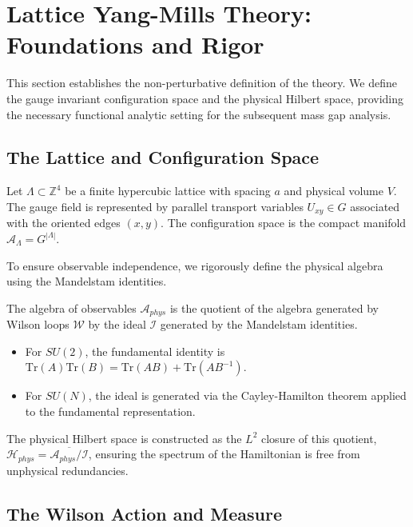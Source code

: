 \section{Lattice Yang-Mills Theory: Foundations and Rigor}
\label{sec:lattice_foundations}

This section establishes the non-perturbative definition of the theory. We define the gauge invariant configuration space and the physical Hilbert space, providing the necessary functional analytic setting for the subsequent mass gap analysis.

\subsection{The Lattice and Configuration Space}

Let \(\Lambda \subset \mathbb{Z}^4\) be a finite hypercubic lattice with spacing \(a\) and physical volume \(V\). The gauge field is represented by parallel transport variables \(U_{xy} \in G\) associated with the oriented edges \((x,y)\). The configuration space is the compact manifold \(\mathcal{A}_\Lambda = G^{|\Lambda|}\).

To ensure observable independence, we rigorously define the physical algebra using the Mandelstam identities.

\begin{definition}
The algebra of observables \(\mathcal{A}_{phys}\) is the quotient of the algebra generated by Wilson loops \(\mathcal{W}\) by the ideal \(\mathcal{I}\) generated by the Mandelstam identities.
\begin{itemize}
    \item For \(SU(2)\), the fundamental identity is \(\text{Tr}(A)\text{Tr}(B) = \text{Tr}(AB) + \text{Tr}(AB^{-1})\).
    \item For \(SU(N)\), the ideal is generated via the Cayley-Hamilton theorem applied to the fundamental representation.
\end{itemize}
The physical Hilbert space is constructed as the \(L^2\) closure of this quotient, \(\mathcal{H}_{phys} = \overline{\mathcal{A}_{phys} / \mathcal{I}}\), ensuring the spectrum of the Hamiltonian is free from unphysical redundancies.
\end{definition}

\subsection{The Wilson Action and Measure}

